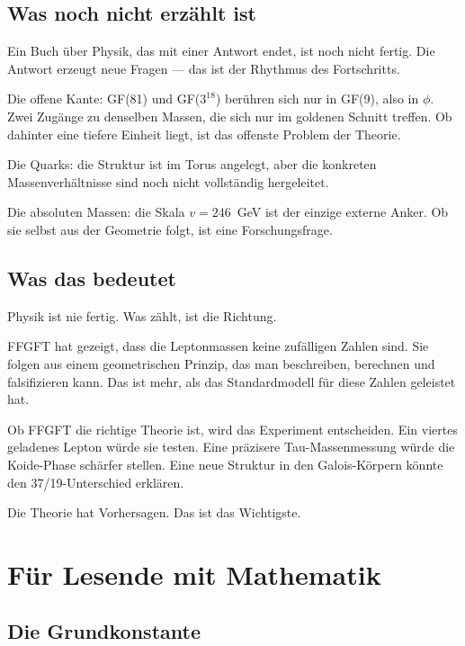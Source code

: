 \documentclass[12pt,oneside]{book}
\begin{document}
\section{Was noch nicht erzählt ist}

Ein Buch über Physik, das mit einer Antwort endet, ist noch nicht fertig. Die Antwort erzeugt neue Fragen — das ist der Rhythmus des Fortschritts.

Die offene Kante: GF(81) und GF($3^{18}$) berühren sich nur in GF(9), also in $\phi$. Zwei Zugänge zu denselben Massen, die sich nur im goldenen Schnitt treffen. Ob dahinter eine tiefere Einheit liegt, ist das offenste Problem der Theorie.

Die Quarks: die Struktur ist im Torus angelegt, aber die konkreten Massenverhältnisse sind noch nicht vollständig hergeleitet.

Die absoluten Massen: die Skala $v = 246$~GeV ist der einzige externe Anker. Ob sie selbst aus der Geometrie folgt, ist eine Forschungsfrage.

\section{Was das bedeutet}

Physik ist nie fertig. Was zählt, ist die Richtung.

FFGFT hat gezeigt, dass die Leptonmassen keine zufälligen Zahlen sind. Sie folgen aus einem geometrischen Prinzip, das man beschreiben, berechnen und falsifizieren kann. Das ist mehr, als das Standardmodell für diese Zahlen geleistet hat.

Ob FFGFT die richtige Theorie ist, wird das Experiment entscheiden. Ein viertes geladenes Lepton würde sie testen. Eine präzisere Tau-Massenmessung würde die Koide-Phase schärfer stellen. Eine neue Struktur in den Galois-Körpern könnte den 37/19-Unterschied erklären.

Die Theorie hat Vorhersagen. Das ist das Wichtigste.

\appendix
\chapter{Für Lesende mit Mathematik}

\section{Die Grundkonstante}
\end{document}
